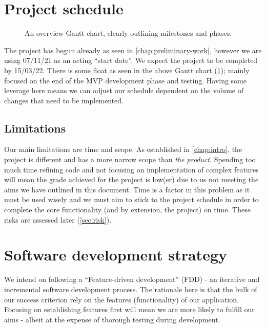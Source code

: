 \vspace{-5mm}
\section{Project schedule}
\begin{figure}[H]
    \noindent{}
    \caption{An overview Gantt chart, clearly outlining milestones and phases.}
    \label{fig:gantt}
\end{figure}
\vspace{-5mm}
The project has begun already as seen in \cref{chap:preliminary-work}, however
we are using 07/11/21 as an acting ``start date''. We expect the project to be completed by
15/03/22. There is some float as seen in the above Gantt chart (\cref{fig:gantt});
mainly focused on the end of the MVP development phase and testing. Having some leverage
here means we can adjust our schedule dependent on the volume of changes that need to be implemented.
\vspace{-5mm}
\subsection{Limitations}
\vspace{-3mm}
Our main limitations are time and scope. As established in \cref{chap:intro},
the project is different and has a more narrow scope than \textit{the product}.
Spending too much time refining code and not focusing on implementation of complex features will mean
the grade achieved for the project is low(er) due to us not meeting the aims we have outlined in this document.
Time is a factor in this problem as it must be used wisely and we must aim to stick to the project schedule in order
to complete the core functionality (and by extension, the project) on time. These risks are assessed later (\cref{sec:risk}).
\pagebreak

\section{Software development strategy}
We intend on following a ``Feature-driven development'' (FDD) - an iterative and incremental software development
process. The rationale here is that the bulk of our success criterion rely on the features (functionality) of our
application. Focusing on establishing features first will mean we are more likely to
fulfill our aims - albeit at the expense of thorough testing during development.
